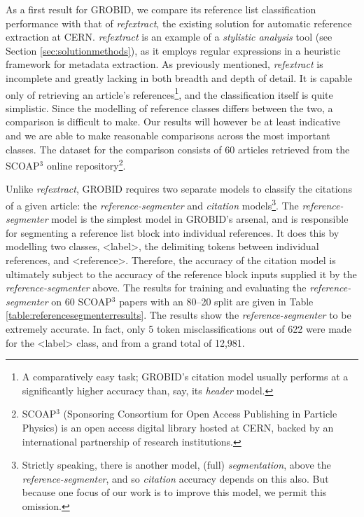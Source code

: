 As a first result for GROBID, we compare its reference list classification performance with that of \emph{refextract}, the existing solution for automatic reference extraction at CERN. \emph{refextract} is an example of a \emph{stylistic analysis} tool (see Section \ref{sec:solutionmethods}), as it employs regular expressions in a heuristic framework for metadata extraction. As previously mentioned, \emph{refextract} is incomplete and greatly lacking in both breadth and depth of detail. It is capable only of retrieving an article's references\footnote{A comparatively easy task; GROBID's citation model usually performs at a significantly higher accuracy than, say, its \emph{header} model.}, and the classification itself is quite simplistic. Since the modelling of reference classes differs between the two, a comparison is difficult to make. Our results will however be at least indicative and we are able to make reasonable comparisons across the most important classes. The dataset for the comparison consists of 60 articles retrieved from the SCOAP$^3$ online repository\footnote{SCOAP$^3$ (Sponsoring Consortium for Open Access Publishing in Particle Physics) is an open access digital library hosted at CERN, backed by an international partnership of research institutions.}.

Unlike \emph{refextract}, GROBID requires two separate models to classify the citations of a given article: the \emph{reference-segmenter} and \emph{citation} models\footnote{Strictly speaking, there is another model, (full) \emph{segmentation}, above the \emph{reference-segmenter}, and so \emph{citation} accuracy depends on this also. But because one focus of our work is to improve this model, we permit this omission.}. The \emph{reference-segmenter} model is the simplest model in GROBID's arsenal, and is responsible for segmenting a reference list block into individual references. It does this by modelling two classes, <label>, the delimiting tokens between individual references, and <reference>. Therefore, the accuracy of the citation model is ultimately subject to the accuracy of the reference block inputs supplied it by the \emph{reference-segmenter} above. The results for training and evaluating the \emph{reference-segmenter} on 60 SCOAP$^3$ papers with an 80--20 split are given in Table \ref{table:referencesegmenterresults}. The results show the \emph{reference-segmenter} to be extremely accurate. In fact, only 5 token misclassifications out of 622 were made for the <label> class, and from a grand total of 12,981.

